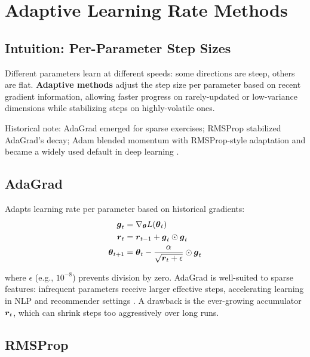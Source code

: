 
\section{Adaptive Learning Rate Methods }
\label{sec:adaptive-methods}

\subsection{Intuition: Per-Parameter Step Sizes}

Different parameters learn at different speeds: some directions are steep, others are flat. \textbf{Adaptive methods} adjust the step size per parameter based on recent gradient information, allowing faster progress on rarely-updated or low-variance dimensions while stabilizing steps on highly-volatile ones.

Historical note: AdaGrad emerged for sparse exercises; RMSProp stabilized AdaGrad's decay; Adam blended momentum with RMSProp-style adaptation and became a widely used default in deep learning \cite{Duchi2011,Tieleman2012,Kingma2014,GoodfellowEtAl2016}.

\subsection{AdaGrad}

Adapts learning rate per parameter based on historical gradients:
\begin{align}
\boldsymbol{g}_t &= \nabla_{\boldsymbol{\theta}} L(\boldsymbol{\theta}_t) \\
\boldsymbol{r}_t &= \boldsymbol{r}_{t-1} + \boldsymbol{g}_t \odot \boldsymbol{g}_t \\
\boldsymbol{\theta}_{t+1} &= \boldsymbol{\theta}_t - \frac{\alpha}{\sqrt{\boldsymbol{r}_t + \epsilon}} \odot \boldsymbol{g}_t
\end{align}

where $\epsilon$ (e.g., $10^{-8}$) prevents division by zero. AdaGrad is well-suited to sparse features: infrequent parameters receive larger effective steps, accelerating learning in NLP and recommender settings \cite{Duchi2011,WebOptimizationDLBook,D2LChapterOptimization}. A drawback is the ever-growing accumulator \(\boldsymbol{r}_t\), which can shrink steps too aggressively over long runs.

\subsection{RMSProp}

